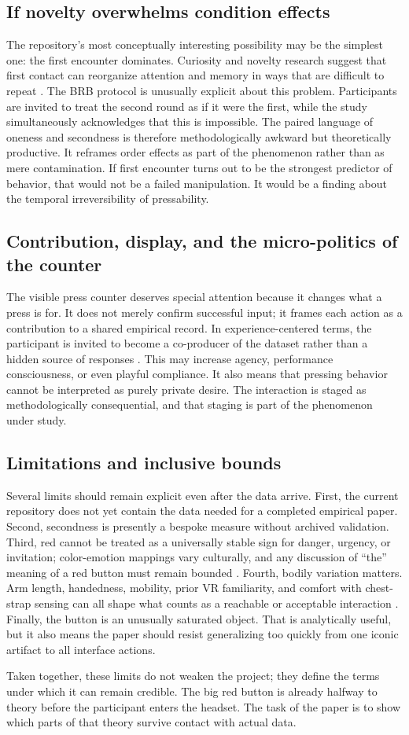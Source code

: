 \subsection{If novelty overwhelms condition effects}

The repository's most conceptually interesting possibility may be the simplest one: the first encounter dominates. Curiosity and novelty research suggest that first contact can reorganize attention and memory in ways that are difficult to repeat \citep{KiddHayden2015,RanganathRainer2003}. The BRB protocol is unusually explicit about this problem. Participants are invited to treat the second round as if it were the first, while the study simultaneously acknowledges that this is impossible. The paired language of oneness and secondness is therefore methodologically awkward but theoretically productive. It reframes order effects as part of the phenomenon rather than as mere contamination. If first encounter turns out to be the strongest predictor of behavior, that would not be a failed manipulation. It would be a finding about the temporal irreversibility of pressability.

\subsection{Contribution, display, and the micro-politics of the counter}

The visible press counter deserves special attention because it changes what a press is for. It does not merely confirm successful input; it frames each action as a contribution to a shared empirical record. In experience-centered terms, the participant is invited to become a co-producer of the dataset rather than a hidden source of responses \citep{McCarthyWright2004}. This may increase agency, performance consciousness, or even playful compliance. It also means that pressing behavior cannot be interpreted as purely private desire. The interaction is staged as methodologically consequential, and that staging is part of the phenomenon under study.

\subsection{Limitations and inclusive bounds}

Several limits should remain explicit even after the data arrive. First, the current repository does not yet contain the data needed for a completed empirical paper. Second, secondness is presently a bespoke measure without archived validation. Third, red cannot be treated as a universally stable sign for danger, urgency, or invitation; color-emotion mappings vary culturally, and any discussion of ``the'' meaning of a red button must remain bounded \citep{GaoEtAl2007,ElliotMaier2014}. Fourth, bodily variation matters. Arm length, handedness, mobility, prior VR familiarity, and comfort with chest-strap sensing can all shape what counts as a reachable or acceptable interaction \citep{Bonin2022,CummingsBailenson2016}. Finally, the button is an unusually saturated object. That is analytically useful, but it also means the paper should resist generalizing too quickly from one iconic artifact to all interface actions.

Taken together, these limits do not weaken the project; they define the terms under which it can remain credible. The big red button is already halfway to theory before the participant enters the headset. The task of the paper is to show which parts of that theory survive contact with actual data.
